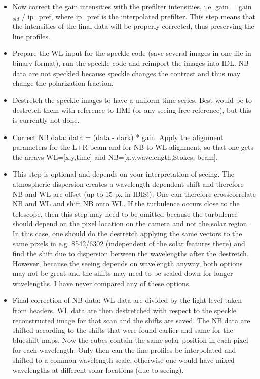 \documentclass[a4paper,11pt]{article}
\begin{document}
\begin{itemize}
\item Now correct the gain intensities with the prefilter intensities, i.e. gain = gain$_{old}$ / ip\_pref, where ip\_pref is the interpolated prefilter. This step means that the intensities of the final data will be properly corrected, thus preserving the line profiles.

\item Prepare the WL input for the speckle code (save several images in one file in binary format), run the speckle code and reimport the images into IDL. NB data are not speckled because speckle changes the contrast and thus may change the polarization fraction.
\item Destretch the speckle images to have a uniform time series. Best would be to destretch them with reference to HMI (or any seeing-free reference), but this is currently not done.

\item Correct NB data:   data = (data - dark) * gain. Apply the alignment parameters for the L+R beam and for NB to WL alignment, so that one gets the arrays WL=[x,y,time] and NB=[x,y,wavelength,Stokes, beam].
           
 \item This step is optional and depends on your interpretation of seeing. The atmospheric dispersion creates a wavelength-dependent shift and therefore NB and WL are offset (up to 15 px in IBIS!). One can therefore crosscorrelate NB and WL and shift NB onto WL. If the turbulence occurs close to the telescope, then this step may need to be omitted because the turbulence should depend on the pixel location on the camera and not the solar region. In this case, one should do the destretch applying the same vectors to the same pixels in e.g. 8542/6302 (independent of the solar features there) and find the shift due to dispersion between the wavelengths after the destretch. However, because the seeing depends on wavelength anyway, both options may not be great and the shifts may need to be scaled down for longer wavelengths. I have never compared any of these options.
 
 \item Final correction of NB data: WL data are divided by the light level taken from headers. WL data are then destretched with respect to the speckle reconstructed image for that scan and the shifts are saved. The NB data are shifted according to the shifts that were found earlier and same for the blueshift maps. Now the cubes contain the same solar position in each pixel for each wavelength. Only then can the line profiles be interpolated and shifted to a common wavelength scale, otherwise one would have mixed wavelengths at different solar locations (due to seeing). 
 

\end{itemize}
\end{document}

